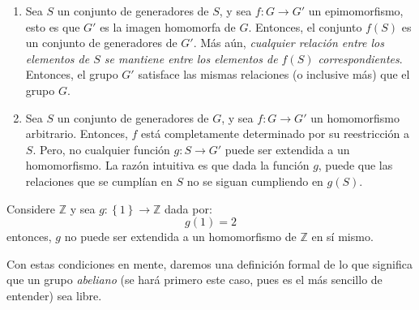 \documentclass[12pt]{report}
\theoremstyle{largebreak}
\newcommand\cf[3]{\ensuremath{#1:#2\rightarrow#3}}
\begin{document}
    \renewcommand{\theenumi}{\arabic{enumi}}
    \begin{enumerate}
        \item Sea $S$ un conjunto de generadores de $S$, y sea $\cf{f}{G}{G'}$ un epimomorfismo, esto es que $G'$ es la imagen homomorfa de $G$. Entonces, el conjunto $f(S)$ es un conjunto de generadores de $G'$. Más aún, \textit{cualquier relación entre los elementos de $S$ se mantiene entre los elementos de $f(S)$ correspondientes}. Entonces, el grupo $G'$ satisface las mismas relaciones (o inclusive más) que el grupo $G$.
        \item Sea $S$ un conjunto de generadores de $G$, y sea $\cf{f}{G}{G'}$ un homomorfismo arbitrario. Entonces, $f$ está completamente determinado por su reestricción a $S$. Pero, no cualquier función $\cf{g}{S}{G'}$ puede ser extendida a un homomorfismo. La razón intuitiva es que dada la función $g$, puede que las relaciones que se cumplían en $S$ no se siguan cumpliendo en $g(S)$.
    \end{enumerate}

    \begin{exa}
        Considere $\mathbb{Z}$ y sea $\cf{g}{\left\{1\right\}}{\mathbb{Z}}$ dada por:
        \begin{equation*}
            g(1)=2
        \end{equation*}
        entonces, $g$  no puede ser extendida a un homomorfismo de $\mathbb{Z}$ en sí mismo.
    \end{exa}

    Con estas condiciones en mente, daremos una definición formal de lo que significa que un grupo \textit{abeliano} (se hará primero este caso, pues es el más sencillo de entender) sea libre.
\end{document}
